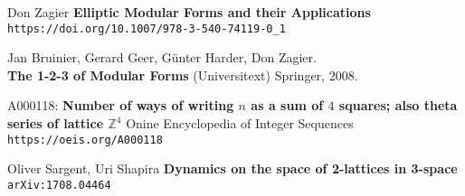 \documentclass[12pt]{article}
\begin{document}
\vfill

\begin{thebibliography}{}


\item Don Zagier \textbf{Elliptic Modular Forms and their Applications} \\ \texttt{https://doi.org/10.1007/978-3-540-74119-0\_1}

\item Jan Bruinier, Gerard Geer, G\"{u}nter Harder, Don Zagier. \\ \textbf{The 1-2-3 of Modular Forms} (Universitext) Springer, 2008.

\item A000118:\textbf{	Number of ways of writing $n$ as a sum of $4$ squares; also theta series of lattice $\mathbb{Z}^4$} Onine Encyclopedia of Integer Sequences \texttt{https://oeis.org/A000118}

\item Oliver Sargent, Uri Shapira \textbf{Dynamics on the space of 2-lattices in 3-space} \texttt{arXiv:1708.04464}

\end{thebibliography}
\end{document}
